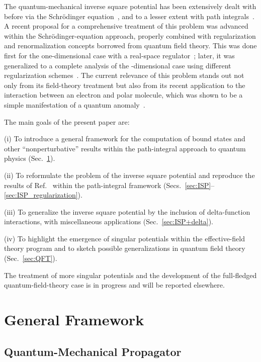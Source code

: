 \documentclass[a4paper,preprint,draft,showpacs,amsmath,amsfonts,amssymb,aps,prd]{revtex4}%
\begin{document}
The quantum-mechanical inverse square potential
has been extensively dealt with before via the
Schr\"{o}dinger equation~\cite{mot:49,gup:93,cam:00,cam:01}, 
and to a lesser extent
with path integrals~\cite{nel:64,pea:69,jar:88,bha:89,gro:98}. 
A recent proposal for a comprehensive treatment of this problem
was advanced within the Schr\"{o}dinger-equation approach, properly
combined with regularization and renormalization concepts 
borrowed from quantum field theory. This was 
done first for the one-dimensional case with a real-space regulator~\cite{gup:93};
later, it was generalized to a complete analysis of the \coordHE{}-dimensional case
using different regularization schemes~\cite{cam:00,cam:01}.
The current relevance of this problem stands out
not only from its field-theory treatment but also from its recent application
to the interaction between an electron and polar molecule, which was shown to be
a simple manifestation of a quantum anomaly~\cite{cam:01b}.

The main goals of the present paper are:

(i) To introduce a general framework for the
computation of bound states and other ``nonperturbative'' results
within the path-integral approach to quantum physics
(Sec.~\ref{sec:general_framework}).

(ii) To reformulate the problem of the inverse square potential
and reproduce the results of 
Ref.~\cite{cam:00} within the path-integral framework
(Secs.~\ref{sec:ISP}--\ref{sec:ISP_regularization}).

(iii) To generalize the inverse square potential
by the inclusion of delta-function interactions, with miscellaneous applications
(Sec.~\ref {sec:ISP+delta}).

(iv) To highlight the emergence of singular potentials within the effective-field theory
program 
and to sketch possible generalizations in quantum field theory
(Sec.~\ref{sec:QFT}).

The treatment of more singular potentials and the development of the 
full-fledged quantum-field-theory case is in progress and will be reported 
elsewhere. 



\section{General Framework}
\label{sec:general_framework}


\subsection{Quantum-Mechanical Propagator}
\label{sec:QM_propagator}
\end{document}
